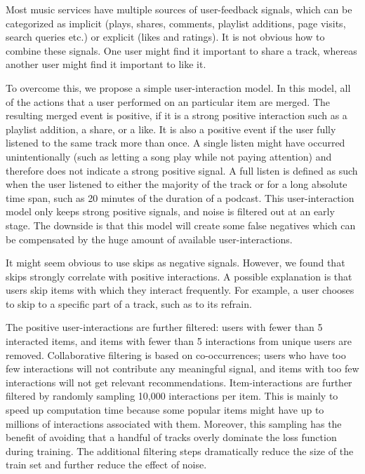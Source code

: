 \documentclass[twocolumn]{article}
\begin{document}
Most music services have multiple sources of user-feedback signals, which can be categorized as implicit (plays, shares, comments, playlist additions, page visits, search queries etc.) or explicit (likes and ratings). It is not obvious how to combine these signals. One user might find it important to share a track, whereas another user might find it important to like it. 

To overcome this, we propose a simple user-interaction model. In this model, all of the actions that a user performed on an particular item are merged. The resulting merged event is positive, if it is a strong positive interaction such as a playlist addition, a share, or a like. It is also a positive event if the user fully listened to the same track more than once. A single listen might have occurred unintentionally (such as letting a song play while not paying attention) and therefore does not indicate a strong positive signal. A full listen is defined as such when the user listened to either the majority of the track or for a long absolute time span, such as 20 minutes of the duration of a podcast. This user-interaction model only keeps strong positive signals, and noise is filtered out at an early stage. The downside is that this model will create some false negatives which can be compensated by the huge amount of available user-interactions. 

It might seem obvious to use skips as negative signals. However, we found that skips strongly correlate with positive interactions. A possible explanation is that users  skip items with which they interact frequently. For example, a user chooses to skip to a specific part of a track, such as to its refrain.

The positive user-interactions are further filtered: users with fewer than 5 interacted items, and items with fewer than 5 interactions from unique users are removed. Collaborative filtering is based on co-occurrences; users who have too few interactions will not contribute any meaningful signal, and items with too few interactions will not get relevant recommendations. Item-interactions are further filtered by randomly sampling 10,000 interactions per item. This is mainly to speed up computation time because some popular items might have up to millions of interactions associated with them. Moreover, this sampling has the benefit of avoiding that a handful of tracks overly dominate the loss function during training. The additional filtering steps dramatically reduce the size of the train set and further reduce the effect of noise. 
\end{document}
